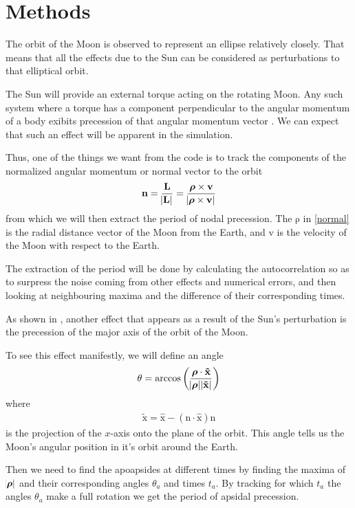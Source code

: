 \documentclass[12pt,a4paper]{article}
\renewcommand{\vec}[1]{\bm{\mathrm{#1}}}
\begin{document}
\section{Methods}

The orbit of the Moon is observed to represent an ellipse relatively closely. That means that all the effects due to the Sun can be considered as perturbations to that elliptical orbit.

The Sun will provide an external torque acting on the rotating Moon. Any such system where a torque has a component perpendicular to the angular momentum of a body exibits precession of that angular momentum vector \cite{morinclassical}. We can expect that such an effect will be apparent in the simulation.

Thus, one of the things we want from the code is to track the components of the normalized angular momentum or normal vector to the orbit
%
\begin{align}\label{normal}
\vec{n} = \frac{\vec{L}}{\abs{\vec{L}}} = \frac{\vec{\rho} \times \vec{v}}{\abs{\vec{\rho} \times \vec{v}}}
\end{align}
%
from which we will then extract the period of nodal precession. The $\vec{\rho}$ in \eqref{normal} is the radial distance vector of the Moon from the Earth, and $\vec{v}$ is the velocity of the Moon with respect to the Earth.

The extraction of the period will be done by calculating the autocorrelation so as to surpress the noise coming from other effects and numerical errors, and then looking at neighbouring maxima and the difference of their corresponding times.

As shown in \textcite{apsidalcalc}, another effect that appears as a result of the Sun's perturbation is the precession of the major axis of the orbit of the Moon.

To see this effect manifestly, we will define an angle
%
\begin{align}
\theta = \arccos \left( \frac{\vec{\rho} \cdot \vec{\tilde{x}}}{\abs{\vec{\rho}} \abs{\vec{\tilde{x}}}} \right)
\end{align}
%
where
%
\begin{align}
\vec{\tilde{x}} = \vec{\hat{x}} - \left( \vec{n} \cdot \vec{\hat{x}} \right) \vec{n}
\end{align}
%
is the projection of the $x$-axis onto the plane of the orbit. This angle tells us the Moon's angular position in it's orbit around the Earth.

Then we need to find the apoapsides at different times by finding the maxima of $\abs{\vec{\rho}}$ and their corresponding angles $\theta_a$ and times $t_a$. By tracking for which $t_a$ the angles $\theta_a$ make a full rotation we get the period of apsidal precession.
\end{document}
